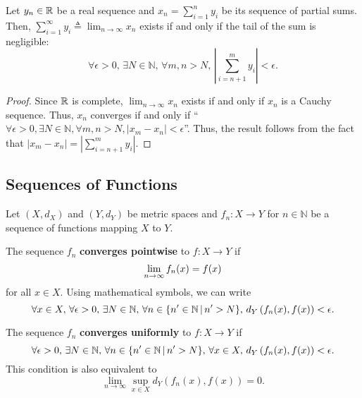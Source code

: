 \begin{lemma} \label{lem:sum_convergence}
Let $y_n \in \mathbb{R}$ be a real sequence and $x_n = \sum_{i=1}^n y_i$ be its sequence of partial sums.
Then, $\sum_{i=1}^\infty y_i \triangleq \lim_{n\to \infty} x_n$ exists if and only if the tail of the sum is negligible:
\[ \forall \epsilon > 0, \, \exists N \in \mathbb{N}, \, \forall m,n>N, \, \left| \sum_{i=n+1}^m y_i \right| < \epsilon. \]
\end{lemma}
\begin{proof}
Since $\mathbb{R}$ is complete, $\lim_{n\to\infty} x_n$ exists if and only if $x_n$ is a Cauchy sequence.
Thus, $x_n$ converges if and only if ``$\forall \epsilon>0, \exists N\in \mathbb{N}, \forall m,n>N, |x_m - x_n|< \epsilon$''.
Thus, the result follows from the fact that $|x_m - x_n| = \left| \sum_{i=n+1}^m y_i \right|$.
\end{proof}



\subsection{Sequences of Functions}

Let $(X,d_X)$ and $(Y,d_Y)$ be metric spaces and
$f_n \colon X \to Y$ for $n\in \mathbb{N}$ be a sequence of functions mapping $X$ to $Y$.

\begin{definition}
The sequence $f_n$ \textbf{converges pointwise} to $f\colon X \to Y$ if \vspace{-1mm}
\[ \lim_{n\to \infty} f_n (x) = f(x) \vspace*{-1mm} \]
for all $x \in X$.
Using mathematical symbols, we can write \vspace{-1mm}
\[ \forall x\in X, \, \forall \epsilon > 0, \, \exists N\in \mathbb{N}, \, \forall n \in \{ n' \in \mathbb{N}\,|\, n'>N \}, \, d_Y \left( f_n(x),f(x) \right) < \epsilon. \vspace*{-1mm} \]
\end{definition}

\begin{definition}
The sequence $f_n$ \textbf{converges uniformly} to $f \colon X \to Y$ if \vspace{-1mm}
\[ \forall \epsilon > 0, \, \exists N\in \mathbb{N}, \, \forall n \in \{ n' \in \mathbb{N}\,|\, n'>N \}, \, \forall x\in X, \, d_Y \left( f_n(x),f(x) \right) < \epsilon. \vspace*{-1mm} \]
This condition is also equivalent to \vspace{-1mm}
\[ \lim_{n\to \infty} \sup_{x\in X} d_Y \left( f_n (x) , f(x) \right) = 0. \]
 \end{definition}

